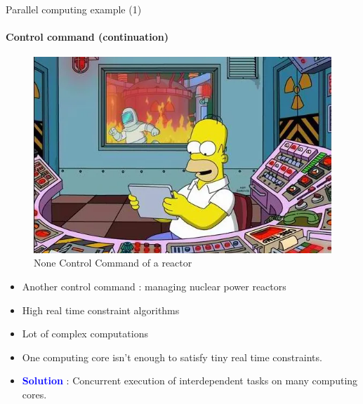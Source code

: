 \documentclass[compress,10pt,aspectratio=169]{beamer}
\begin{document}
\begin{frame}[fragile]{Parallel computing example (1)}
    \framesubtitle{Control command (continuation)}
    \small
    \begin{multicols}{2}
        \begin{figure}[h]      
            \includegraphics[width=\linewidth]{../Images/NuclearPlantSimpson.png}
            \caption{None Control Command of a reactor}
        \end{figure}
    \begin{itemize}
        \item Another control command : managing nuclear power reactors
        \item High real time constraint algorithms
        \item Lot of complex computations
        \item One computing core isn't enough to satisfy tiny real time constraints.
        \item \textcolor{blue}{\bf Solution} : Concurrent execution of interdependent tasks on many computing cores.
    \end{itemize}
\end{multicols}
\end{frame}
\end{document}
